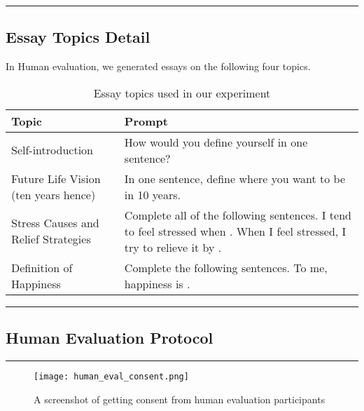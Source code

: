 \noindent\rule{\columnwidth}{0.3mm}
\newline

\subsection{Essay Topics Detail}
\label{sec:appendix_human_eval_essay_topic}


In Human evaluation, we generated essays on the following four topics.

\begin{table}[htbp]
\centering
\begin{tabularx}{\textwidth}{lX}
\toprule
\textbf{Topic} & \textbf{Prompt} \\
\midrule
Self-introduction & How would you define yourself in one sentence? \\
\midrule
Future Life Vision (ten years hence) & In one sentence, define where you want to be in 10 years. \\
\midrule
Stress Causes and Relief Strategies & Complete all of the following sentences. 
\newline
I tend to feel stressed when \underline{\hspace{3cm}}. \newline
When I feel stressed, I try to relieve it by \underline{\hspace{3cm}}. \\
\midrule
Definition of Happiness & Complete the following sentences. 
\newline
To me, happiness is \underline{\hspace{3cm}}. \\
\bottomrule
\end{tabularx}
\caption{Essay topics used in our experiment}
\label{tab:essay_topics}
\end{table}

\noindent\rule{\columnwidth}{0.3mm}


\subsection{Human Evaluation Protocol}
\label{sec:appendix_human_eval_protocol}


\noindent\rule{\columnwidth}{0.3mm}


\begin{figure*}[h]
    \centering
    \texttt{[image: human\_eval\_consent.png]}
    \caption{A screenshot of getting consent from human evaluation participants}
    \label{fig:screenshot_consent}
\end{figure*}



